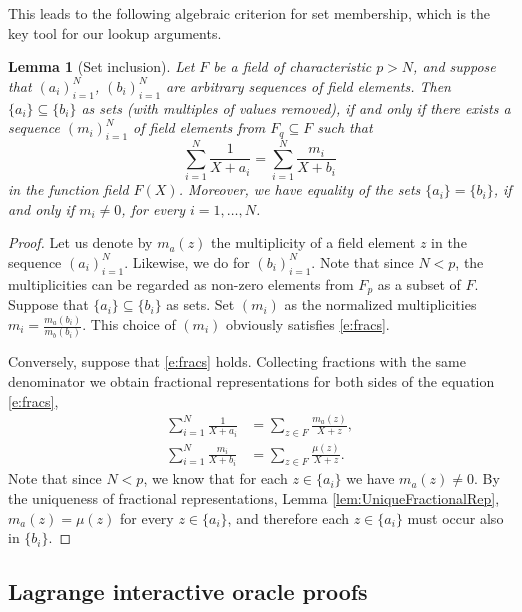\documentclass[11pt]{article}
\newtheorem{lem}[]{Lemma}
\theoremstyle{definition}
\theoremstyle{definition}
\begin{document}
This leads to the following algebraic criterion for set membership, which is the key tool for our lookup arguments.
\begin{lem}[Set inclusion]
\label{lem:batchsetmembership}
Let $F$ be a field of characteristic $p>N$, and suppose that $(a_i)_{i=1}^N$, $(b_i)_{i=1}^N$ are arbitrary sequences of field elements.
Then $\{a_i \}\subseteq \{b_i\}$ as sets (with multiples of values removed), if and only if there exists a sequence $(m_i)_{i=1}^N$ of field elements from $F_q\subseteq F$ such that
\begin{equation}
\label{e:fracs}
\sum_{i=1}^N \frac{1}{X + a_i} = \sum_{i=1}^N \frac{m_i}{X + b_i}  
\end{equation}
in the function field $F(X)$.
Moreover, we have equality of the sets $\{a_i\} = \{b_i\}$, if and only if $m_i\neq 0$, for every $i=1,\ldots, N$.
\end{lem}

\begin{proof}%
Let us denote by $m_a(z)$ the multiplicity of a field element $z$ in the sequence $(a_i)_{i=1}^N$.
Likewise, we do for $(b_i)_{i=1}^N$.
Note that since $N < p$, the multiplicities can be regarded as non-zero elements from $F_p$ as a subset of $F$.
Suppose that $\{a_i\}\subseteq \{b_i\}$ as sets. 
Set $(m_i)$ as the normalized multiplicities
$
m_i = \frac{m_a(b_i)}{m_b(b_i)}.
$
This choice of $(m_i)$ obviously satisfies \eqref{e:fracs}.

Conversely, suppose that \eqref{e:fracs} holds.
Collecting fractions with the same denominator we obtain fractional representations for both sides of the equation \eqref{e:fracs},  
\begin{align*}
\sum_{i=1}^N \frac{1}{X + a_i} &= \sum_{z\in F} \frac{m_a(z)}{X + z},
\\
\sum_{i=1}^N \frac{m_i}{X + b_i} & = \sum_{z\in F} \frac{\mu (z)}{X + z}.
\end{align*}
Note that since $N < p$, we know that for each $z\in \{a_i\}$ we have $m_a(z)\neq 0$. 
By the uniqueness of fractional representations,  Lemma \ref{lem:UniqueFractionalRep}, $m_a(z) = \mu(z)$ for every $z\in \{a_i\}$, and therefore each $z\in \{a_i\}$ must occur also in $\{b_i\}$. 
\end{proof}



\subsection{Lagrange interactive oracle proofs}
\end{document}
